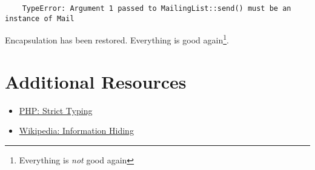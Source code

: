 \begin{verbatim}
    TypeError: Argument 1 passed to MailingList::send() must be an instance of Mail
\end{verbatim}

Encapsulation has been restored. Everything is good again\footnote{Everything is \textit{not} good again}.



\section{Additional Resources}

\begin{itemize}[leftmargin=*]
    \item \href{http://www.php.net/manual/en/functions.arguments.php#functions.arguments.type-declaration.strict}{PHP: Strict Typing}
    \item \href{https://en.wikipedia.org/wiki/Information_hiding}{Wikipedia: Information Hiding}
\end{itemize}
